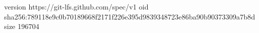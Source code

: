 version https://git-lfs.github.com/spec/v1
oid sha256:789118e9c0b70189668f2171f226e395d9839348723e86ba90b90373309a7b8d
size 196704
